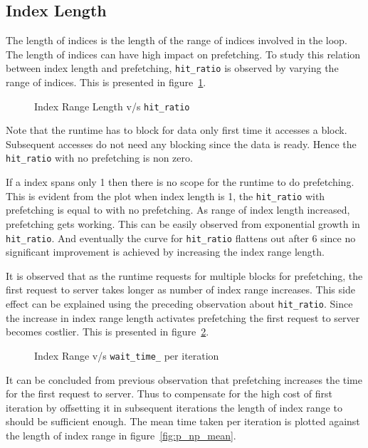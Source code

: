 \subsection{Index Length}
The length of indices is the length of the range of indices involved in the loop.
The length of indices can have high impact on prefetching. To study this relation
between index length and prefetching, \texttt{hit\_ratio} is observed by varying
the range of indices. This is presented in figure~\ref{fig:hitratio}.
\begin{figure}[h]
  
  \caption{Index Range Length v/s \texttt{hit\_ratio}}
  \label{fig:hitratio}
\end{figure}

Note that the runtime has to block for data only first time it accesses a block.
Subsequent accesses do not need any blocking since the data is ready. Hence the
\texttt{hit\_ratio} with no prefetching is non zero.

If a index spans only 1 then there is no scope for the runtime to do prefetching.
This is evident from the plot when index length is 1, the \texttt{hit\_ratio} with
prefetching is equal to with no prefetching. As range of index length increased,
prefetching gets working. This can be easily observed from exponential growth in
\texttt{hit\_ratio}. And eventually the curve for \texttt{hit\_ratio} flattens out
after 6 since no significant improvement is achieved by increasing the index range
length.

It is observed that as the runtime requests for multiple blocks for prefetching,
the first request to server takes longer as number of index range increases. This
side effect can be explained using the preceding observation about \texttt{hit\_ratio}.
Since the increase in index range length activates prefetching the first request
to server becomes costlier. This is presented in figure~\ref{fig:p_first_mean}.
\begin{figure}[h]
  
  \caption{Index Range v/s \texttt{wait\_time\_} per iteration}
  \label{fig:p_first_mean}
\end{figure}

It can be concluded from previous observation that prefetching increases the time
for the first request to server. Thus to compensate for the high cost of first
iteration by offsetting it in subsequent iterations the length of index range to
should be sufficient enough. The mean time taken per iteration is plotted against
the length of index range in figure~\ref{fig:p_np_mean}.


